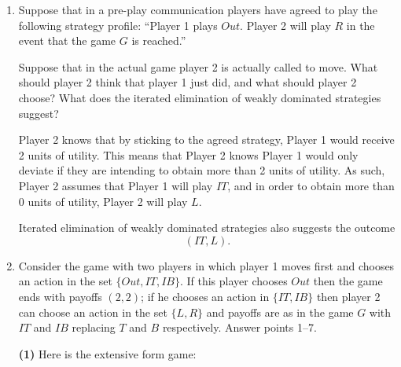 \documentclass[11pt,english]{article}
\begin{document}
\begin{enumerate}
\begin{solution}
The resulting game is:
\[
\begin{array}{r|c}
 & L \\ \hline
IT & 5,1
\end{array}
\]
\end{solution}
  \item[(7)] Suppose that in a pre-play communication players have agreed to
    play the following strategy profile: ``Player 1 plays $Out$. Player 2 will
    play $R$ in the event that the game $G$ is reached.''
 
    Suppose that in the actual game player 2 is actually called to move. What
    should player 2 think that player 1 just did, and what should player 2
    choose? What does the iterated elimination of weakly dominated strategies
    suggest?
 \begin{solution}
Player 2 knows that by sticking to the agreed strategy, Player 1 would receive
2 units of utility. This means that Player 2 knows Player 1 would only deviate
if they are intending to obtain more than 2 units of utility. As such, Player 2
assumes that Player 1 will play $IT$, and in order to obtain more than 0 units
of utility, Player 2 will play $L$.
 
Iterated elimination of weakly dominated strategies also suggests the outcome
\[
    \boxed{(IT, L).}
\]
\end{solution}
  \item[(8)] Consider the game with two players in which player 1 moves first
    and chooses an action in the set $\{Out, IT, IB\}$. If this player chooses
    $Out$ then the game ends with payoffs $(2,2)$; if he chooses an action in
    $\{IT, IB\}$ then player 2 can choose an action in the set $\{L, R\}$ and
    payoffs are as in the game $G$ with $IT$ and $IB$ replacing $T$ and $B$
    respectively. Answer points 1--7.
\begin{solution}
\textbf{(1)} Here is the extensive form game:
 
\begin{center}
\end{center}
\end{solution}
\end{enumerate}
\end{document}
